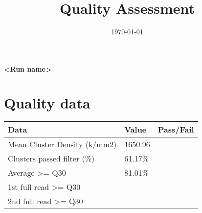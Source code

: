 \documentclass{article}
\title{Quality Assessment}
\date{\mydate\today}
\begin{document}
\maketitle
\begin{flushright}
\Large{\textbf{<Run name>}}
\end{flushright}
\section{Quality data}
\begin{tabular}{l|l|l}
Data&Value&Pass/Fail\\
\hline
Mean Cluster Density (k/mm2)&1650.96&\\
Clusters passed filter (\%)&61.17\%&\\
Average >= Q30&81.01\%&\\
1st full read >= Q30&&\\
2nd full read >= Q30&&\\
\end{tabular}
\end{document}
